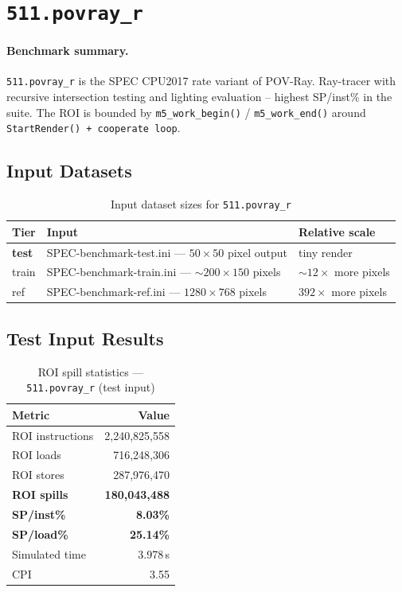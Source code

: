 \documentclass[11pt,a4paper]{article}
\begin{document}
\section{\texttt{511.povray\_r}}
\label{sec:povray}

\paragraph{Benchmark summary.}
\texttt{511.povray\_r} is the SPEC CPU2017 rate variant of POV-Ray.
Ray-tracer with recursive intersection testing and lighting evaluation -- highest SP/inst\% in the suite.
The ROI is bounded by \texttt{m5\_work\_begin()} / \texttt{m5\_work\_end()}
around \texttt{StartRender() + cooperate loop}.

\subsection{Input Datasets}

\begin{table}[H]
\centering
\caption{Input dataset sizes for \texttt{511.povray\_r}}
\label{tab:povray_inputs}
\small
\begin{tabular}{lp{8cm}l}
\toprule
\textbf{Tier} & \textbf{Input} & \textbf{Relative scale} \\
\midrule
\textbf{test} & SPEC-benchmark-test.ini --- $50\times50$ pixel output & tiny render \\
train & SPEC-benchmark-train.ini --- ${\sim}200\times150$ pixels & ${\sim}12\times$ more pixels \\
ref & SPEC-benchmark-ref.ini --- $1280\times768$ pixels & $392\times$ more pixels \\
\bottomrule
\end{tabular}
\end{table}

\subsection{Test Input Results}

\begin{table}[H]
\centering
\caption{ROI spill statistics --- \texttt{511.povray\_r} (test input)}
\label{tab:povray_test_roi}
\begin{tabular}{lr}
\toprule
\textbf{Metric} & \textbf{Value} \\
\midrule
ROI instructions & 2,240,825,558 \\
ROI loads        & 716,248,306 \\
ROI stores       & 287,976,470 \\
\textbf{ROI spills}   & \textbf{180,043,488} \\
\textbf{SP/inst\%}   & \textbf{8.03\%} \\
\textbf{SP/load\%}   & \textbf{25.14\%} \\
Simulated time   & 3.978\,s \\
CPI              & 3.55 \\
\bottomrule
\end{tabular}
\end{table}
\end{document}

